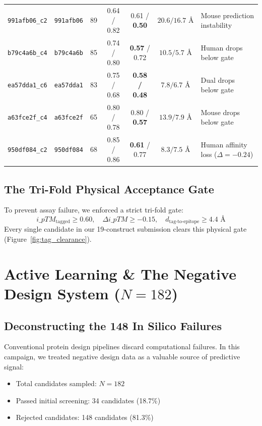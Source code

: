 \documentclass[11pt]{article}
\begin{document}
\begin{table}[htbp]
\begin{tabularx}{\textwidth}{p{2.5cm}p{1.4cm}ccccX}
\texttt{\scriptsize 991afb06\_c2} & \texttt{991afb06} & 89 & 0.64 / 0.82 & 0.61 / \textbf{0.50} & $20.6 / 16.7\text{ \AA}$ & Mouse prediction instability \\
\texttt{\scriptsize b79c4a6b\_c4} & \texttt{b79c4a6b} & 85 & 0.74 / 0.80 & \textbf{0.57} / 0.72 & $10.5 / 5.7\text{ \AA}$ & Human drops below gate \\
\texttt{\scriptsize ea57dda1\_c6} & \texttt{ea57dda1} & 83 & 0.75 / 0.68 & \textbf{0.58 / 0.48} & $7.8 / 6.7\text{ \AA}$ & Dual drops below gate \\
\texttt{\scriptsize a63fce2f\_c4} & \texttt{a63fce2f} & 65 & 0.80 / 0.78 & 0.80 / \textbf{0.57} & $13.9 / 7.9\text{ \AA}$ & Mouse drops below gate \\
\texttt{\scriptsize 950df084\_c2} & \texttt{950df084} & 68 & 0.85 / 0.86 & \textbf{0.61} / 0.77 & $8.3 / 7.5\text{ \AA}$ & Human affinity loss ($\Delta = -0.24$) \\
\bottomrule
\end{tabularx}
\end{table}

\subsection{The Tri-Fold Physical Acceptance Gate}
To prevent assay failure, we enforced a strict tri-fold gate:
\begin{equation}
    i\_pTM_{\text{tagged}} \ge 0.60, \quad \Delta i\_pTM \ge -0.15, \quad d_{\text{tag-to-epitope}} \ge 4.4\text{ \AA}
\end{equation}
Every single candidate in our 19-construct submission clears this physical gate (Figure~\ref{fig:tag_clearance}).

\section{Active Learning \& The Negative Design System ($N=182$)}

\subsection{Deconstructing the 148 In Silico Failures}
Conventional protein design pipelines discard computational failures. In this campaign, we treated negative design data as a valuable source of predictive signal:
\begin{itemize}
    \item Total candidates sampled: $N = 182$
    \item Passed initial screening: 34 candidates (18.7\%)
    \item Rejected candidates: 148 candidates (81.3\%)
\end{itemize}
\end{document}
